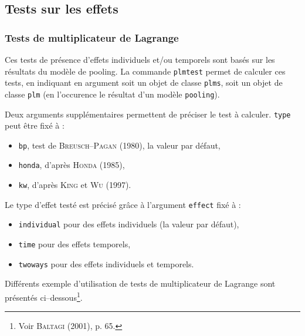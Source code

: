 \documentclass[a4paper]{article}
\begin{document}
\subsection{Tests sur les effets}



\subsubsection{Tests de multiplicateur de Lagrange}

Ces tests de présence d'effets individuels et/ou temporels sont basés sur
les résultats du modèle de pooling. La commande \texttt{plmtest}
permet de calculer ces tests, en indiquant en argument soit un objet
de classe \texttt{plms}, soit un objet de classe \texttt{plm} (en
l'occurence le résultat d'un modèle \texttt{pooling}). 

Deux arguments supplémentaires permettent de préciser le test à
calculer. \texttt{type} peut être fixé à :

\begin{itemize}
\item \texttt{bp}, test de \textsc{Breusch--Pagan} (1980), la valeur par défaut,
\item \texttt{honda}, d'après \textsc{Honda} (1985),
\item \texttt{kw}, d'après \textsc{King} et \textsc{Wu} (1997).
\end{itemize}

Le type d'effet testé est précisé grâce à l'argument \texttt{effect}
fixé à :

\begin{itemize}
\item \texttt{individual} pour des effets individuels (la valeur par défaut),
\item \texttt{time} pour des effets temporels,
\item \texttt{twoways} pour des effets individuels et temporels.
\end{itemize}

Différents exemple d'utilisation de tests de multiplicateur de Lagrange
sont présentés ci--dessous\footnote{Voir \textsc{Baltagi} (2001), p. 65.}.
\end{document}
